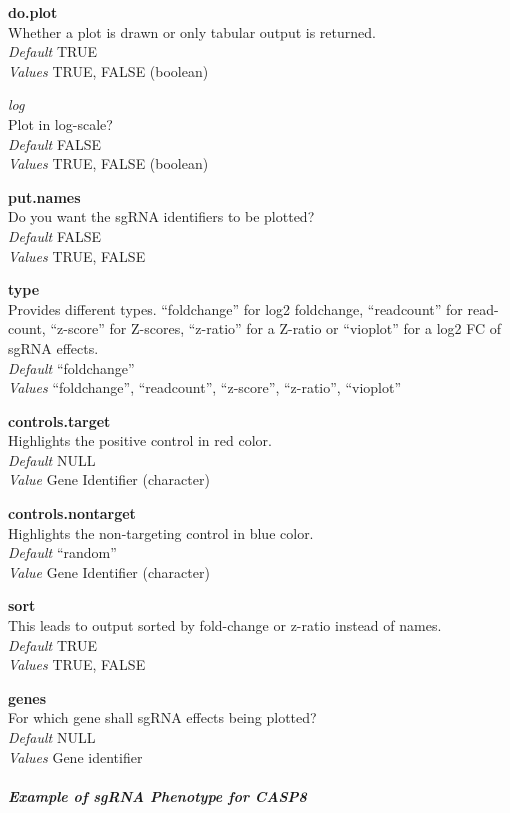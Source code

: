 \documentclass[]{article}
\let\oldsubparagraph\subparagraph
\renewcommand{\subparagraph}[1]{\oldsubparagraph{#1}\mbox{}}
\begin{document}
\textbf{do.plot}\\
Whether a plot is drawn or only tabular output is returned.\\
\emph{Default} TRUE\\
\emph{Values} TRUE, FALSE (boolean)

\emph{log}\\
Plot in log-scale?\\
\emph{Default} FALSE\\
\emph{Values} TRUE, FALSE (boolean)

\textbf{put.names}\\
Do you want the sgRNA identifiers to be plotted?\\
\emph{Default} FALSE\\
\emph{Values} TRUE, FALSE

\textbf{type}\\
Provides different types. ``foldchange'' for log2 foldchange,
``readcount'' for read-count, ``z-score'' for Z-scores, ``z-ratio'' for
a Z-ratio or ``vioplot'' for a log2 FC of sgRNA effects.\\
\emph{Default} ``foldchange''\\
\emph{Values} ``foldchange'', ``readcount'', ``z-score'', ``z-ratio'',
``vioplot''

\textbf{controls.target}\\
Highlights the positive control in red color.\\
\emph{Default} NULL\\
\emph{Value} Gene Identifier (character)

\textbf{controls.nontarget}\\
Highlights the non-targeting control in blue color.\\
\emph{Default} ``random''\\
\emph{Value} Gene Identifier (character)

\textbf{sort}\\
This leads to output sorted by fold-change or z-ratio instead of
names.\\
\emph{Default} TRUE\\
\emph{Values} TRUE, FALSE

\textbf{genes}\\
For which gene shall sgRNA effects being plotted?\\
\emph{Default} NULL\\
\emph{Values} Gene identifier

\subparagraph{Example of sgRNA Phenotype for
CASP8}\label{example-of-sgrna-phenotype-for-casp8}
\end{document}

